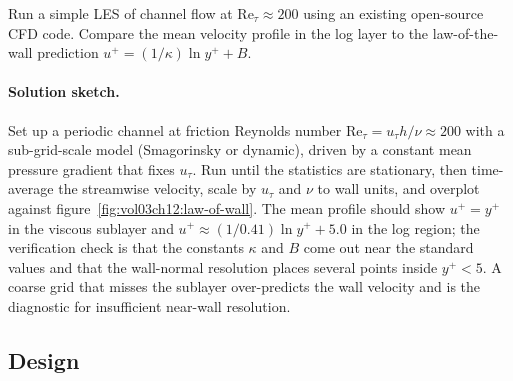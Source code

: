 \begin{exercise}
Run a simple LES of channel flow at $\text{Re}_\tau \approx 200$
using an existing open-source CFD code. Compare the mean velocity
profile in the log layer to the law-of-the-wall prediction
$u^+ = (1/\kappa)\ln y^+ + B$.

\paragraph{Solution sketch.} Set up a periodic channel at friction
Reynolds number $\text{Re}_\tau = u_\tau h/\nu\approx200$ with a
sub-grid-scale model (Smagorinsky or dynamic), driven by a constant
mean pressure gradient that fixes $u_\tau$. Run until the statistics
are stationary, then time-average the streamwise velocity, scale by
$u_\tau$ and $\nu$ to wall units, and overplot against
figure~\ref{fig:vol03ch12:law-of-wall}. The mean profile should show
$u^+ = y^+$ in the viscous sublayer and $u^+\approx(1/0.41)\ln y^+ +
5.0$ in the log region; the verification check is that the constants
$\kappa$ and $B$ come out near the standard values and that the
wall-normal resolution places several points inside $y^+<5$. A
coarse grid that misses the sublayer over-predicts the wall velocity
and is the diagnostic for insufficient near-wall resolution.
\end{exercise}

\subsection*{Design}

